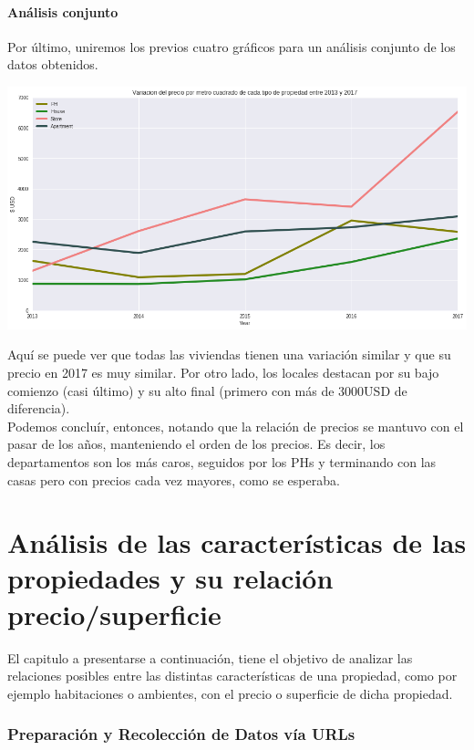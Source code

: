 \documentclass[a4paper, 10pt]{article}
\newcommand\tab[1][0.5cm]{\hspace*{#1}}
\begin{document}
			\subsection{Análisis conjunto}
				Por último, uniremos los previos cuatro gráficos para un análisis conjunto de los datos obtenidos.
				\begin{center}
   		    			\includegraphics[width=\textwidth]{images/jointVariation}
				\end{center}
				\tab Aquí se puede ver que todas las viviendas tienen una variación similar y que su precio en 2017 es muy similar.
				Por otro lado, los locales destacan por su bajo comienzo (casi último) y su alto final (primero con más de $3000$USD
				de diferencia). \\
				\tab Podemos concluír, entonces, notando que la relación de precios se mantuvo con el pasar de los años, manteniendo
				el orden de los precios. Es decir, los departamentos son los más caros, seguidos por los PHs y terminando con
				las casas pero con precios cada vez mayores, como se esperaba.			
			
		\part{Análisis de las características de las propiedades y su relación precio/superficie}
	
		El capitulo a presentarse a continuación, tiene el objetivo de analizar las relaciones posibles entre las distintas características de una propiedad, como por ejemplo habitaciones o ambientes, con el precio o superficie de dicha propiedad.
		
		\section{Preparación y Recolección de Datos vía URLs}
		
\end{document}
